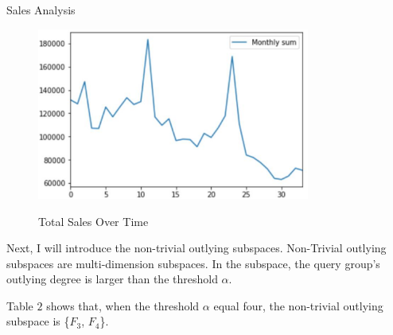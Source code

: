 \documentclass[
 size=12pt,
 paper=smartboard,  %
 mode=present, 		%
 display=slides, 	%
 style=tuliplab,  	%
 pauseslide,
 fleqn,leqno]{powerdot}
\begin{document}
\begin{slide}{Sales Analysis}
  \begin{figure}[htbp]
    \centering
    \includegraphics[width=0.8\textwidth,height=0.5\textwidth]{figures/Figure5.eps}\\
    \caption{Total Sales Over Time}
  \end{figure}
  
  \begin{note}
  Next,
  I will introduce the non-trivial outlying subspaces.
  Non-Trivial outlying subspaces are multi-dimension subspaces.
  In the subspace,
  the query group's outlying degree is larger than the threshold $\alpha$.
  
  Table $2$ shows that,
  when the threshold $\alpha$ equal four,
  the non-trivial outlying subspace is \{$F_3$, $F_4$\}.
  \end{note}
  
  \end{slide}
\end{document}
